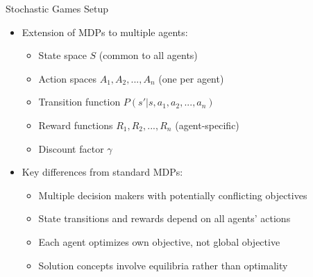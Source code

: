 \documentclass[10pt]{beamer}
\begin{document}

\begin{frame}{Stochastic Games Setup}
    \begin{itemize}
        \item Extension of MDPs to multiple agents:
        \begin{itemize}
            \item State space $S$ (common to all agents)
            \item Action spaces $A_1, A_2, ..., A_n$ (one per agent)
            \item Transition function $P(s'|s,a_1,a_2,...,a_n)$
            \item Reward functions $R_1, R_2, ..., R_n$ (agent-specific)
            \item Discount factor $\gamma$
        \end{itemize}
        \vspace{0.2cm}
        \item Key differences from standard MDPs:
        \begin{itemize}
            \item Multiple decision makers with potentially conflicting objectives
            \item State transitions and rewards depend on all agents' actions
            \item Each agent optimizes own objective, not global objective
            \item Solution concepts involve equilibria rather than optimality
        \end{itemize}
    \end{itemize}
\end{frame}
\end{document}
